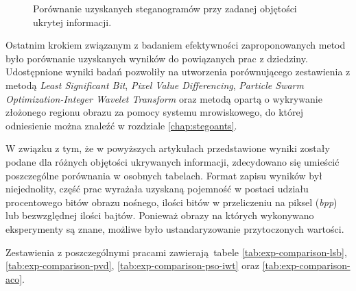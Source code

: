 {\begin{figure}
        \caption[Porównanie rezultatów]
        {
            Porównanie uzyskanych steganogramów przy zadanej objętości ukrytej informacji.
        }
        \label{fig:exp-edge-results}
    \end{figure}


    Ostatnim krokiem związanym z badaniem efektywności zaproponowanych metod było porównanie uzyskanych wyników do
    powiązanych prac z dziedziny. Udostępnione wyniki badań pozwoliły na utworzenia porównującego zestawienia z metodą
    \textit{Least Significant Bit}\cite{Solak2018LSBSA}, \textit{Pixel Value Differencing}\cite{Solak2018LSBSA},
    \textit{Particle Swarm Optimization-Integer Wavelet Transform}\cite{Muhuri2020ANI} oraz metodą opartą o wykrywanie
    złożonego regionu obrazu za pomocy systemu mrowiskowego\cite{Khan2018AntCO}, do której odniesienie można znaleźć w
    rozdziale \ref{chap:stegoants}.

    W związku z tym, że w powyższych artykułach przedstawione wyniki zostały podane dla różnych objętości ukrywanych
    informacji, zdecydowano się umieścić poszczególne porównania w osobnych tabelach. Format zapisu wyników był
    niejednolity, część prac wyrażała uzyskaną pojemność w postaci udziału procentowego bitów obrazu nośnego, ilości
    bitów w przeliczeniu na piksel (\textit{bpp}) lub bezwzględnej ilości bajtów. Ponieważ obrazy na których wykonywano
    eksperymenty są znane, możliwe było ustandaryzowanie przytoczonych wartości.

    Zestawienia z poszczególnymi pracami zawierają tabele \ref{tab:exp-comparison-lsb}, \ref{tab:exp-comparison-pvd},
    \ref{tab:exp-comparison-pso-iwt} oraz \ref{tab:exp-comparison-aco}.

}

